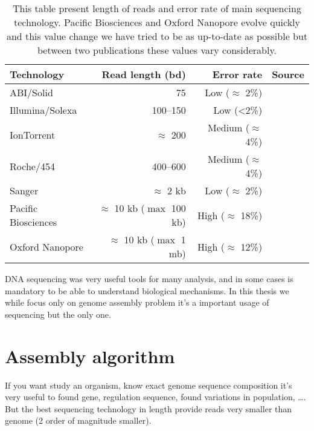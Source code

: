 \documentclass[main.tex]{subfiles}
\begin{document}
\begin{table}[]
    \centering
    \begin{tabular}{l|rr|l}
         Technology          & Read length (bd)                 & Error rate    & Source                          \\ \hline
         ABI/Solid           & 75                               & Low ($\approx$ 2\%)    & \cite{seq_assembly_demystified} \\
         Illumina/Solexa     & 100–150                          & Low (<2\%)             & \cite{seq_assembly_demystified} \\
         IonTorrent          & $\approx$ 200                    & Medium ($\approx$ 4\%) & \cite{seq_assembly_demystified} \\
         Roche/454           & 400–600                          & Medium ($\approx$ 4\%) & \cite{seq_assembly_demystified} \\
         Sanger              & $\approx$ 2 kb                   & Low ($\approx$ 2\%)    & \cite{seq_assembly_demystified} \\
         Pacific Biosciences & $\approx$ 10 kb ($\max$ 100 kb)  & High ($\approx$ 18\%)  & \cite{seq_assembly_demystified} \cite{longread_dark_matter} \\
         Oxford Nanopore     & $\approx$ 10 kb ($\max$ 1 mb)    & High ($\approx$ 12\%)  & \cite{longread_dark_matter} \cite{nanopore_read_accuracy} \\
    \end{tabular}
    \caption{This table present length of reads and error rate of main sequencing technology. Pacific Biosciences and Oxford Nanopore evolve quickly and this value change we have tried to be as up-to-date as possible but between two publications these values vary considerably.}
    \label{intro:tab:technology_property}
\end{table}


DNA sequencing was very useful tools for many analysis, and in some cases is mandatory to be able to understand biological mechanisms. In this thesis we while focus only on genome assembly problem it's a important usage of sequencing but the only one.

\section{Assembly algorithm}

If you want study an organism, know exact genome sequence composition it's very useful to found gene, regulation sequence, found variations in population, …. But the best sequencing technology in length provide reads very smaller than genome (2 order of magnitude smaller).
\end{document}
